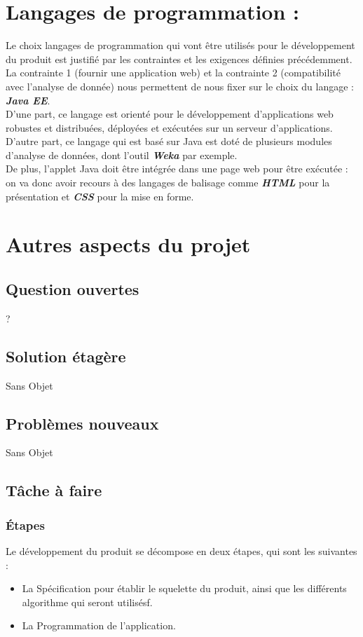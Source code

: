 		
	\section{Langages de programmation :} 
	Le choix langages de programmation qui vont être utilisés pour le développement du produit est justifié par les contraintes et les exigences définies précédemment.\\
	La contrainte 1 (fournir une application web) et la contrainte 2 (compatibilité avec l'analyse de donnée) nous permettent de nous fixer sur le choix du langage : \textbf{\textit{Java EE}}.\\
	D'une part, ce langage est orienté pour le développement d'applications web robustes et distribuées, déployées et exécutées sur un serveur d'applications. D'autre part, ce langage qui est basé sur Java est doté de plusieurs modules d'analyse de données, dont l'outil \textbf{\textit{Weka}} par exemple.\\
	De plus, l'applet Java doit être intégrée dans une page web pour être exécutée : on va donc avoir recours à des langages de balisage comme \textbf{\textit{HTML}} pour la présentation et \textbf{\textit{CSS}} pour la mise en forme.
		
		
	\section{Autres aspects du projet}
		\subsection{Question ouvertes}
			?
		\subsection{Solution étagère}
			Sans Objet
		\subsection{Problèmes nouveaux}
			Sans Objet
		\subsection{Tâche à faire}
			\subsubsection{Étapes}
			Le développement du produit se décompose en deux étapes, qui sont les suivantes :
				\begin{itemize}
				\item La Spécification pour établir le squelette du produit, ainsi que les différents algorithme qui seront utilisésf.
				\item La Programmation de l'application.
				\end{itemize}
